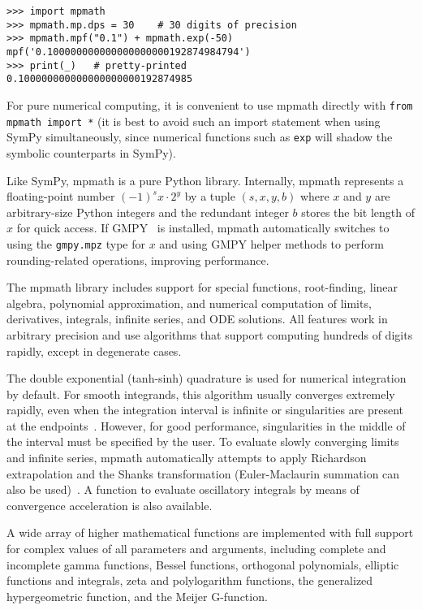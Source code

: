 \begin{verbatim}
>>> import mpmath
>>> mpmath.mp.dps = 30    # 30 digits of precision
>>> mpmath.mpf("0.1") + mpmath.exp(-50)
mpf('0.100000000000000000000192874984794')
>>> print(_)   # pretty-printed
0.100000000000000000000192874985
\end{verbatim}

For pure numerical computing, it is convenient to use mpmath directly
with \texttt{from mpmath import *} (it is best to avoid such an
import statement when using SymPy simultaneously, since numerical
functions such as \texttt{exp} will shadow the symbolic counterparts
in SymPy).

Like SymPy, mpmath is a pure Python library.
Internally, mpmath represents a floating-point number
$(-1)^s x \cdot 2^y$ by a tuple $(s, x, y, b)$ where
$x$ and $y$ are arbitrary-size Python integers
and the redundant integer $b$ stores the bit length of $x$ for quick access.
If GMPY~\cite{GMPY} is installed, mpmath automatically switches to
using the \texttt{gmpy.mpz} type for $x$ and using GMPY helper methods
to perform rounding-related operations, improving performance.

The mpmath library includes support for
special functions, root-finding, linear algebra, polynomial approximation,
and numerical computation of limits, derivatives, integrals, infinite
series, and ODE solutions. All features work in arbitrary precision
and use algorithms that support computing hundreds of digits rapidly,
except in degenerate cases.

The double exponential (tanh-sinh) quadrature is used for numerical
integration by default. For smooth integrands, this algorithm usually
converges extremely rapidly, even when the integration interval is infinite
or singularities are present at the endpoints~\cite{takahasi1974double,bailey2005comparison}.
However, for good performance, singularities
in the middle of the interval must be specified
by the user.
To evaluate slowly converging limits and infinite series, mpmath
automatically attempts to apply Richardson extrapolation and the
Shanks transformation
(Euler-Maclaurin summation can also be used)~\cite{BenderOrszag1999}.
A function to evaluate oscillatory integrals by means of convergence
acceleration is also available.

A wide array of higher mathematical functions are implemented
with full support for complex values of all parameters and arguments,
including complete and incomplete gamma functions,
Bessel functions, orthogonal polynomials, elliptic functions and integrals,
zeta and polylogarithm functions,
the generalized hypergeometric function, and the Meijer G-function.

